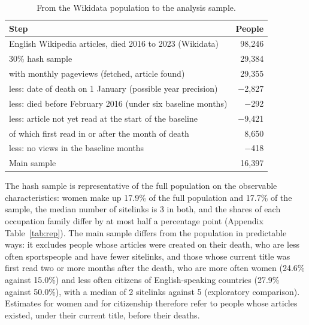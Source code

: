\documentclass[11pt,a4paper]{article}
\begin{document}
\begin{table}[tbp]\centering\small\caption{From the Wikidata population to the analysis sample.}\label{tab:flow}\begin{tabular}{lr}\toprule Step & People\\\midrule
English Wikipedia articles, died 2016 to 2023 (Wikidata) & 98,246\\
30\% hash sample & 29,384\\
\quad with monthly pageviews (fetched, article found) & 29,355\\
\quad less: date of death on 1 January (possible year precision) & $-$2,827\\
\quad less: died before February 2016 (under six baseline months) & $-$292\\
\quad less: article not yet read at the start of the baseline & $-$9,421\\
\qquad of which first read in or after the month of death & 8,650\\
\quad less: no views in the baseline months & $-$418\\\midrule
Main sample & 16,397\\\bottomrule\end{tabular}\end{table}

The hash sample is representative of the full population on the observable characteristics: women make up 17.9\% of the full population and 17.7\% of the sample, the median number of sitelinks is 3 in both, and the shares of each occupation family differ by at most half a percentage point (Appendix Table~\ref{tab:rep}). The main sample differs from the population in predictable ways: it excludes people whose articles were created on their death, who are less often sportspeople and have fewer sitelinks, and those whose current title was first read two or more months after the death, who are more often women (24.6\% against 15.0\%) and less often citizens of English-speaking countries (27.9\% against 50.0\%), with a median of 2 sitelinks against 5 (exploratory comparison). Estimates for women and for citizenship therefore refer to people whose articles existed, under their current title, before their deaths.
\end{document}
